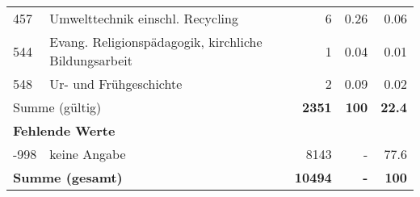 \begin{longtable}{lXrrr}
        457 & \multicolumn{1}{X}{Umwelttechnik einschl. Recycling} & %
          \num{6} &
          \num[round-mode=places,round-precision=2]{0.26} &
          \num[round-mode=places,round-precision=2]{0.06} \\

        544 & \multicolumn{1}{X}{Evang. Religionspädagogik, kirchliche Bildungsarbeit} & %
          \num{1} &
          \num[round-mode=places,round-precision=2]{0.04} &
          \num[round-mode=places,round-precision=2]{0.01} \\

        548 & \multicolumn{1}{X}{Ur- und Frühgeschichte} & %
          \num{2} &
          \num[round-mode=places,round-precision=2]{0.09} &
          \num[round-mode=places,round-precision=2]{0.02} \\

     \midrule
     \multicolumn{2}{l}{Summe (gültig)} &
       \textbf{\num{2351}} &
     \textbf{\num{100}} &
       \textbf{\num[round-mode=places,round-precision=2]{22.4}} \\
     \multicolumn{5}{l}{\textbf{Fehlende Werte}}\\
       -998 &
       keine Angabe &
         \num{8143} &
        - &
         \num[round-mode=places,round-precision=2]{77.6} \\
     \midrule
     \multicolumn{2}{l}{\textbf{Summe (gesamt)}} &
          \textbf{\num{10494}} &
        \textbf{-} &
        \textbf{\num{100}} \\
     \bottomrule
     \end{longtable}
     
